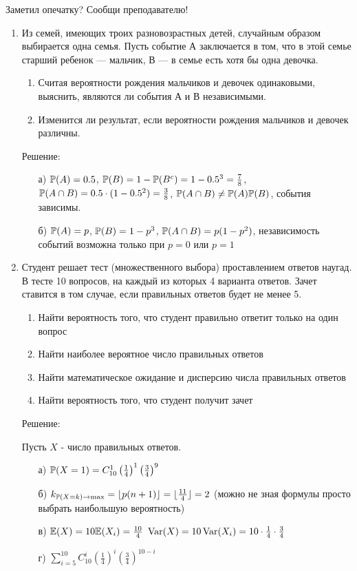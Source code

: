 \documentclass[12pt, a4paper]{article}\usepackage[]{graphicx}\usepackage[]{color}
\begin{document}
Заметил опечатку? Сообщи преподавателю!

\begin{enumerate}
\item  Из семей, имеющих троих разновозрастных детей, случайным
образом выбирается одна семья. Пусть событие А заключается в том,
что в этой семье
старший ребенок — мальчик, В — в семье есть хотя бы одна девочка.
\begin{enumerate}
\item Считая вероятности рождения мальчиков и девочек одинаковыми,
выяснить, являются ли события А и В независимыми.
\item Изменится ли результат, если вероятности рождения мальчиков и
девочек различны.
\end{enumerate}
Решение:
\begin{enumerate}
\item[а)] $\P(A)=0.5$, $\P(B)=1-\P(B^{c})=1-0.5^{3}=\frac{7}{8}$, $\P(A\cap
B)=0.5\cdot (1-0.5^{2})=\frac{3}{8}$, $\P(A\cap B)\neq \P(A)\P(B)$,
события зависимы.
\item[б)] $\P(A)=p$, $\P(B)=1-p^{3}$, $\P(A\cap B)=p(1-p^{2})$,
независимость событий возможна только при $p=0$ или $p=1$
\end{enumerate}
\item Студент решает тест (множественного выбора) проставлением
ответов наугад. В тесте 10 вопросов, на каждый из которых 4
варианта ответов. Зачет ставится в том случае, если правильных
ответов будет не менее 5.
\begin{enumerate}
\item Найти вероятность того, что студент правильно ответит только
на один вопрос
\item Найти наиболее вероятное число правильных ответов
\item Найти математическое ожидание и дисперсию числа правильных
ответов
\item Найти вероятность того, что студент получит зачет
\end{enumerate}
Решение:

Пусть $X$ - число правильных ответов.
\begin{enumerate}
\item[а)] $\P(X=1)=C_{10}^{1}\left(\frac{1}{4}\right)^{1}\left(\frac{3}{4}\right)^{9}$
\item[б)] $k_{\P(X=k)\rightarrow \max}=\lfloor p(n+1)\rfloor=\lfloor
\frac{11}{4}\rfloor=2$ (можно не зная формулы просто выбрать
наибольшую вероятность)
\item[в)] $\E(X)=10\E(X_{i})=\frac{10}{4}$
$\Var(X)=10\Var(X_{i})=10 \cdot \frac{1}{4} \cdot \frac{3}{4}$
\item[г)] $\sum_{i=5}^{10}C_{10}^{i}\left(\frac{1}{4}\right)^{i}\left(\frac{3}{4}\right)^{10-i}$
\end{enumerate}


\end{enumerate}
\end{document}
